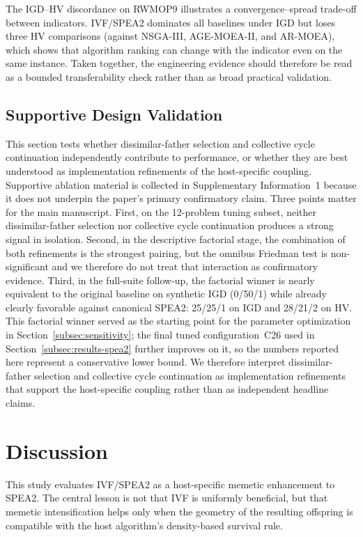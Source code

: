 \documentclass[pdflatex,sn-mathphys-ay]{sn-jnl}%
\theoremstyle{thmstyleone}%
\theoremstyle{thmstyletwo}%
\theoremstyle{thmstylethree}%
\begin{document}
The IGD--HV discordance on RWMOP9 illustrates a convergence--spread trade-off between indicators. IVF/SPEA2 dominates all baselines under IGD but loses three HV comparisons (against NSGA-III, AGE-MOEA-II, and AR-MOEA), which shows that algorithm ranking can change with the indicator even on the same instance. Taken together, the engineering evidence should therefore be read as a bounded transferability check rather than as broad practical validation.

\FloatBarrier
\subsection{Supportive Design Validation}\label{subsec:ablation}
This section tests whether dissimilar-father selection and collective cycle continuation independently contribute to performance, or whether they are best understood as implementation refinements of the host-specific coupling. Supportive ablation material is collected in Supplementary Information~1 because it does not underpin the paper's primary confirmatory claim. Three points matter for the main manuscript. First, on the 12-problem tuning subset, neither dissimilar-father selection nor collective cycle continuation produces a strong signal in isolation. Second, in the descriptive factorial stage, the combination of both refinements is the strongest pairing, but the omnibus Friedman test is non-significant and we therefore do not treat that interaction as confirmatory evidence. Third, in the full-suite follow-up, the factorial winner is nearly equivalent to the original baseline on synthetic IGD (0/50/1) while already clearly favorable against canonical SPEA2: 25/25/1 on IGD and 28/21/2 on HV. This factorial winner served as the starting point for the parameter optimization in Section~\ref{subsec:sensitivity}; the final tuned configuration~C26 used in Section~\ref{subsec:results-spea2} further improves on it, so the numbers reported here represent a conservative lower bound. We therefore interpret dissimilar-father selection and collective cycle continuation as implementation refinements that support the host-specific coupling rather than as independent headline claims.



\section{Discussion}\label{sec:discussion}

This study evaluates IVF/SPEA2 as a host-specific memetic enhancement to SPEA2. The central lesson is not that IVF is uniformly beneficial, but that memetic intensification helps only when the geometry of the resulting offspring is compatible with the host algorithm's density-based survival rule.
\end{document}
